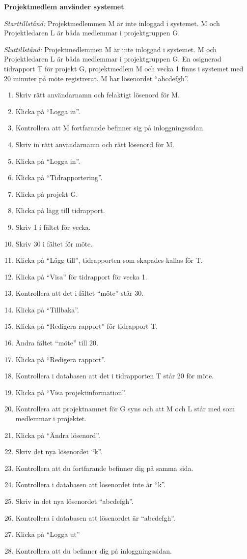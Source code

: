 \documentclass[a4paper]{article}
\begin{document}
\begin{ST}
\item \textbf{Projektmedlem använder systemet}

\emph{Starttillstånd:} Projektmedlemmen M är inte inloggad i systemet. M och Projektledaren L är båda medlemmar i projektgruppen G.

\emph{Sluttillstånd:} Projektmedlemmen M är inte inloggad i systemet. M och Projektledaren L är båda medlemmar i projektgruppen G. En osignerad tidrapport T för projekt G, projektmedlem M och vecka 1 finns i systemet med 20 minuter på möte registrerat. M har lösenordet ``abcdefgh''.

\begin{enumerate}
\item Skriv rätt användarnamn och felaktigt lösenord för M.
\item Klicka på ``Logga in''.
\item Kontrollera att M fortfarande befinner sig på inloggningssidan.
\item Skriv in rätt användarnamn och rätt lösenord för M.
\item Klicka på ``Logga in''.
\item Klicka på ``Tidrapportering''.
\item Klicka på projekt G.
\item Klicka på lägg till tidrapport.
\item Skriv 1 i fältet för vecka.
\item Skriv 30 i fältet för möte.
\item Klicka på ``Lägg till'', tidrapporten som skapades kallas för T.
\item Klicka på ``Visa'' för tidrapport för vecka 1.
\item Kontrollera att det i fältet ``möte'' står 30.
\item Klicka på ``Tillbaka''.
\item Klicka på ``Redigera rapport'' för tidrapport T.
\item Ändra fältet ``möte'' till 20.
\item Klicka på ``Redigera rapport''.
\item Kontrollera i databasen att det i tidrapporten T står 20 för möte.
\item Klicka på ``Visa projektinformation''.
\item Kontrollera att projektnamnet för G syns och att M och L står med som medlemmar i projektet.
\item Klicka på ``Ändra lösenord''.
\item Skriv det nya lösenordet ``k''.
\item Kontrollera att du fortfarande befinner dig på samma sida.
\item Kontrollera i databasen att lösenordet inte är ``k''.
\item Skriv in det nya lösenordet ``abcdefgh''.
\item Kontrollera i databasen att lösenordet är ``abcdefgh''.
\item Klicka på ``Logga ut''
\item Kontrollera att du befinner dig på inloggningssidan.


\end{enumerate}
\end{ST}
\end{document}
